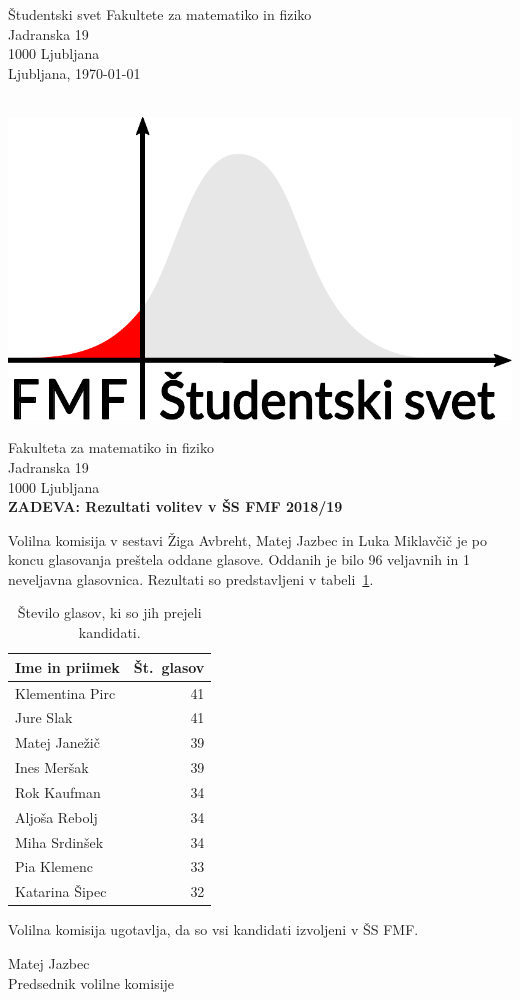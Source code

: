 \documentclass[a4paper,oneside,12pt]{article}
\begin{document}
\begin{minipage}[t]{0.7\linewidth}
Študentski svet Fakultete za matematiko in fiziko \\
Jadranska 19 \\
1000 Ljubljana \\

Ljubljana, \today\\
\end{minipage}%
\begin{minipage}[t]{0.3\linewidth}
  \mbox{} \\[-15pt]
  \hspace*{\fill} \includegraphics[width=0.9\linewidth]{ssfmf_logo_col.pdf}
\end{minipage}

Fakulteta za matematiko in fiziko \\
Jadranska 19 \\
1000 Ljubljana \\

\textbf{ZADEVA: Rezultati volitev v ŠS FMF 2018/19}

Volilna komisija v sestavi Žiga Avbreht, Matej Jazbec in Luka Miklavčič je po koncu glasovanja preštela oddane
glasove. Oddanih je bilo 96 veljavnih in 1 neveljavna
glasovnica. Rezultati so predstavljeni v tabeli~\ref{tab:rez}.

\begin{table}[!h]
    \centering
    \begin{tabular}{|l|r|} \hline
\textbf{Ime	in priimek} & \textbf{Št.\ glasov} \\ \hline
Klementina Pirc & 41 \\ \hline
Jure Slak & 41 \\ \hline
Matej Janežič & 39\\ \hline
Ines Meršak & 39 \\ \hline
Rok Kaufman & 34 \\ \hline
Aljoša Rebolj & 34 \\ \hline
Miha Srdinšek & 34 \\ \hline
Pia Klemenc & 33 \\ \hline
Katarina Šipec & 32 \\ \hline
    \end{tabular}
    \caption{Število glasov, ki so jih prejeli kandidati.}
    \label{tab:rez}
\end{table}

Volilna komisija ugotavlja, da so vsi kandidati izvoljeni v ŠS FMF.

\vspace{5ex}

\hspace*{\fill} Matej Jazbec \\
\hspace*{\fill} Predsednik volilne komisije
\end{document}
